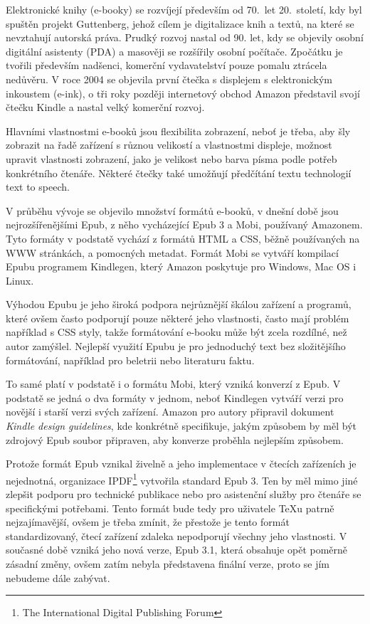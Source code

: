 \documentclass{csbulletin}
\begin{document}



Elektronické knihy (e-booky) se rozvíjejí především od 70.~let 20.~století, kdy
byl spuštěn projekt Guttenberg, jehož cílem je digitalizace knih a textů, na
které se nevztahují autorská práva. Prudký rozvoj nastal od 90. let, kdy se
objevily osobní digitální asistenty (PDA) a masověji se rozšířily osobní
počítače. Zpočátku je tvořili především nadšenci, komerční vydavatelství pouze
pomalu ztrácela nedůvěru. V roce 2004 se objevila první čtečka s displejem s
elektronickým inkoustem (e-ink), o tři roky později internetový obchod Amazon
představil svojí čtečku Kindle a nastal velký komerční rozvoj.

Hlavními vlastnostmi e-booků jsou flexibilita zobrazení, neboť je třeba, aby
šly zobrazit na řadě zařízení s různou velikostí a vlastnostmi displeje,
možnost upravit vlastnosti zobrazení, jako je velikost nebo barva písma podle
potřeb konkrétního čtenáře. Některé čtečky také umožňují předčítání textu
technologií text to speech.

V průběhu vývoje se objevilo množství formátů e-booků, v dnešní době jsou
nejrozšířenějšími Epub, z něho vycházející Epub 3 a Mobi, používaný Amazonem.
Tyto formáty v podstatě vychází z formátů HTML a CSS, běžně používaných na WWW
stránkách, a pomocných metadat. Formát Mobi se vytváří kompilací Epubu
programem Kindlegen, který Amazon poskytuje pro Windows, Mac OS i Linux. 

Výhodou Epubu je jeho široká podpora nejrůznější škálou zařízení a programů,
které ovšem často podporují pouze některé jeho vlastnosti, často mají problém
například s CSS styly, takže formátování e-booku může být zcela rozdílné, než
autor zamýšlel. Nejlepší využití Epubu je pro jednoduchý text bez složitějšího
formátování, například pro beletrii nebo literaturu faktu. 

To samé platí v podstatě i o formátu Mobi, který vzniká konverzí z Epub. V
podstatě se jedná o dva formáty v jednom, neboť Kindlegen vytváří verzi pro
novější i starší verzi svých zařízení. Amazon pro autory připravil dokument
\textit{Kindle design guidelines}, kde konkrétně specifikuje, jakým způsobem by
měl být zdrojový Epub soubor připraven, aby konverze proběhla nejlepším
způsobem.

Protože formát Epub vznikal živelně a jeho implementace v čtecích zařízeních je
nejednotná, organizace IPDF\footnote{The International Digital Publishing
Forum} vytvořila standard Epub 3. Ten by měl mimo jiné zlepšit podporu pro
technické publikace nebo pro asistenční služby pro čtenáře se specifickými
potřebami. Tento formát bude tedy pro uživatele \TeX u patrně nejzajímavější,
ovšem je třeba zmínit, že přestože je tento formát standardizovaný, čtecí
zařízení zdaleka nepodporují všechny jeho vlastnosti. V současné době vzniká
jeho nová verze, Epub 3.1, která obsahuje opět poměrně zásadní změny, ovšem
zatím nebyla představena finální verze, proto se jím nebudeme dále zabývat.
\end{document}
